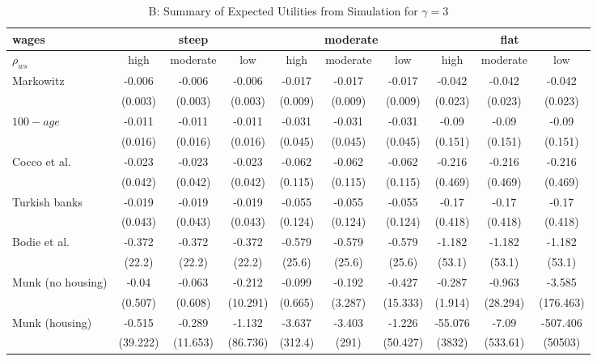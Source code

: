 \documentclass[]{elsarticle}
\begin{document}
\begin{table}[h!]\ContinuedFloat
	\centering
	\caption{B: Summary of Expected Utilities from Simulation for $\gamma=3$}
	\label{table:util}
	\begin{tabular}[c]{|l|ccc|ccc|ccc|}
		\hline
		 wages& \multicolumn{3}{c|}{steep} & \multicolumn{3}{c|}{moderate} & \multicolumn{3}{c|}{flat}\\
		\hline
		$\rho_{ws}$&high&moderate&low&high&moderate&low&high&moderate&low\\
		\hline
Markowitz					&-0.006&-0.006&-0.006&-0.017&-0.017&-0.017&-0.042&-0.042&-0.042\\
							&(0.003)&(0.003)&(0.003)&(0.009)&(0.009)&(0.009)&(0.023)&(0.023)&(0.023)\\
$100-age$					&-0.011&-0.011&-0.011&-0.031&-0.031&-0.031&-0.09&-0.09&-0.09\\
							&(0.016)&(0.016)&(0.016)&(0.045)&(0.045)&(0.045)&(0.151)&(0.151)&(0.151)\\
Cocco et al.				&-0.023&-0.023&-0.023&-0.062&-0.062&-0.062&-0.216&-0.216&-0.216\\
							&(0.042)&(0.042)&(0.042)&(0.115)&(0.115)&(0.115)&(0.469)&(0.469)&(0.469)\\
Turkish banks			 	&-0.019&-0.019&-0.019&-0.055&-0.055&-0.055&-0.17&-0.17&-0.17\\
							&(0.043)&(0.043)&(0.043)&(0.124)&(0.124)&(0.124)&(0.418)&(0.418)&(0.418)\\
Bodie et al.			 	&-0.372&-0.372&-0.372&-0.579&-0.579&-0.579&-1.182&-1.182&-1.182\\
							&(22.2)&(22.2)&(22.2)&(25.6)&(25.6)&(25.6)&(53.1)&(53.1)&(53.1)\\
Munk (no housing)			&-0.04&-0.063&-0.212&-0.099&-0.192&-0.427&-0.287&-0.963&-3.585\\
							&(0.507)&(0.608)&(10.291)&(0.665)&(3.287)&(15.333)&(1.914)&(28.294)&(176.463)\\
Munk (housing)				&-0.515&-0.289&-1.132&-3.637&-3.403&-1.226&-55.076&-7.09&-507.406\\
							&(39.222)&(11.653)&(86.736)&(312.4)&(291)&(50.427)&(3832)&(533.61)&(50503)\\
	\hline
	\end{tabular}
\end{table}
\end{document}
